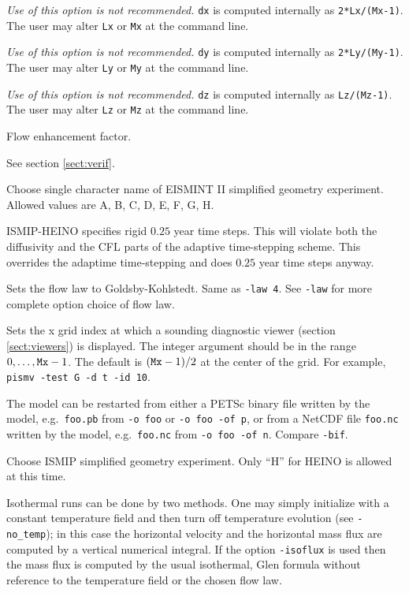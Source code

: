 \documentclass[12pt,final]{amsart}
\renewcommand{\t}[1]{\texttt{#1}}
\begin{document}
  \emph{Use of this option is not recommended.}  \verb|dx| is computed internally as \verb|2*Lx/(Mx-1)|.  The user may alter \verb|Lx| or \verb|Mx| at the command line.

  \emph{Use of this option is not recommended.}  \verb|dy| is computed internally as \verb|2*Ly/(My-1)|.  The user may alter \verb|Ly| or \verb|My| at the command line.

  \emph{Use of this option is not recommended.}  \verb|dz| is computed internally as \verb|Lz/(Mz-1)|.  The user may alter \verb|Lz| or \verb|Mz| at the command line.

  Flow enhancement factor.

  See section \ref{sect:verif}.

  Choose single character name of EISMINT II \cite{EISMINT00} simplified geometry experiment.  Allowed values are A, B, C, D, E, F, G, H.

  ISMIP-HEINO specifies rigid $0.25$ year time steps.  This will violate both the diffusivity and the CFL parts of the adaptive time-stepping scheme.  This overrides the adaptime time-stepping and does $0.25$ year time steps anyway.

  Sets the flow law to Goldsby-Kohlstedt.  Same as \verb|-law 4|.  See \verb|-law| for more complete option choice of flow law.

  Sets the x grid index at which a sounding diagnostic viewer (section \ref{sect:viewers}) is displayed.  The integer argument should be in the range $0,\dots,\text{\t{Mx}}-1$.  The default is $(\text{\t{Mx}}-1)/2$ at the center of the grid.  For example, \verb|pismv -test G -d t -id 10|.

  The model can be restarted from either a PETSc binary file written by the model, e.g.~\verb|foo.pb| from \verb|-o foo| or \verb|-o foo -of p|, or from a NetCDF file \verb|foo.nc| written by the model, e.g.~\verb|foo.nc| from \verb|-o foo -of n|.  Compare \verb|-bif|.

  Choose ISMIP simplified geometry experiment.  Only ``H'' for HEINO is allowed at this time.

  Isothermal runs can be done by two methods.  One may simply initialize with a constant temperature field and then turn off temperature evolution (see \verb|-no_temp|); in this case the horizontal velocity and the horizontal mass flux are computed by a vertical numerical integral.  If the option \verb|-isoflux| is used then the mass flux is computed by the usual isothermal, Glen formula without reference to the temperature field or the chosen flow law.
\end{document}

